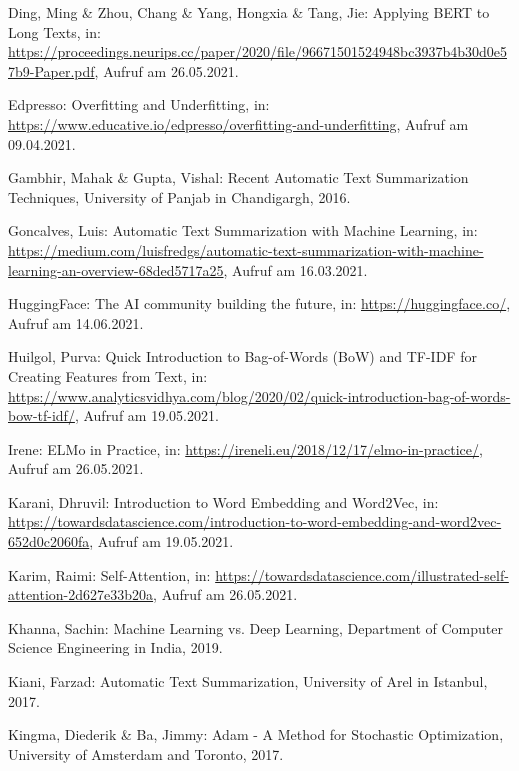 \begin{thebibliography}{116}
Ding, Ming \& Zhou, Chang \& Yang, Hongxia \& Tang, Jie: Applying BERT to Long Texts, in: \url{https://proceedings.neurips.cc/paper/2020/file/96671501524948bc3937b4b30d0e57b9-Paper.pdf}, Aufruf am 26.05.2021.

Edpresso: Overfitting and Underfitting, in: \url{https://www.educative.io/edpresso/overfitting-and-underfitting}, Aufruf am 09.04.2021.

Gambhir, Mahak \& Gupta, Vishal: Recent Automatic Text Summarization Techniques, University of Panjab in Chandigargh, 2016.

Goncalves, Luis: Automatic Text Summarization with Machine Learning, in: \url{https://medium.com/luisfredgs/automatic-text-summarization-with-machine-learning-an-overview-68ded5717a25}, Aufruf am 16.03.2021.

HuggingFace: The AI community building the future, in: \url{https://huggingface.co/}, Aufruf am 14.06.2021.

Huilgol, Purva: Quick Introduction to Bag-of-Words (BoW) and TF-IDF for Creating Features from Text, in: \url{https://www.analyticsvidhya.com/blog/2020/02/quick-introduction-bag-of-words-bow-tf-idf/}, Aufruf am 19.05.2021.

Irene: ELMo in Practice, in: \url{https://ireneli.eu/2018/12/17/elmo-in-practice/}, Aufruf am 26.05.2021.

Karani, Dhruvil: Introduction to Word Embedding and Word2Vec, in: \url{https://towardsdatascience.com/introduction-to-word-embedding-and-word2vec-652d0c2060fa}, Aufruf am 19.05.2021.

Karim, Raimi: Self-Attention, in: \url{https://towardsdatascience.com/illustrated-self-attention-2d627e33b20a}, Aufruf am 26.05.2021.

Khanna, Sachin: Machine Learning vs. Deep Learning, Department of Computer Science Engineering in India, 2019.

Kiani, Farzad: Automatic Text Summarization, University of Arel in Istanbul, 2017.

Kingma, Diederik \& Ba, Jimmy: Adam - A Method for Stochastic Optimization, University of Amsterdam and Toronto, 2017.


\end{thebibliography}
